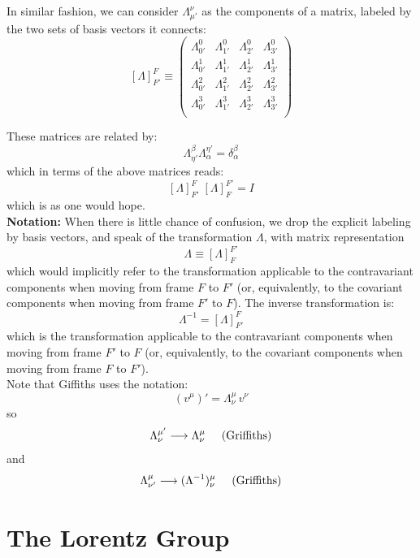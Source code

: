 \documentclass[12pt]{article}
\begin{document}
\noindent
In similar fashion, we can consider $\Lambda^{\nu}_{\mu'}$ as the
components of a matrix, labeled by the two sets of basis vectors it
connects:
$$[\Lambda]^F_{F'}
\equiv \begin{pmatrix}
  \Lambda^{0}_{0'} &\Lambda^{0}_{1'} &\Lambda^{0}_{2'} &\Lambda^{0}_{3'} \\[3pt]
  \Lambda^{1}_{0'} &\Lambda^{1}_{1'} &\Lambda^{1}_{2'} &\Lambda^{1}_{3'} \\[3pt]
  \Lambda^{2}_{0'} &\Lambda^{2}_{1'} &\Lambda^{2}_{2'} &\Lambda^{2}_{3'} \\[3pt]
  \Lambda^{3}_{0'} &\Lambda^{3}_{1'} &\Lambda^{3}_{2'} &\Lambda^{3}_{3'} \\
\end{pmatrix}$$

\noindent
These matrices are related by:
$$\Lambda^{\beta}_{\eta'} \Lambda^{\eta'}_{\alpha} = \delta^{\beta}_{\alpha}$$
which in terms of the above matrices reads:
$$[\Lambda]^F_{F'} \;  [\Lambda]^{F'}_F = I $$
which is as one would hope.\\[4pt]

\noindent
{\bf Notation:} When there is little chance of confusion,
we drop the explicit labeling by basis vectors, and speak
of the transformation $\Lambda$, with matrix representation
$$\Lambda \equiv [\Lambda]^{F'}_F$$
which would implicitly refer to the
transformation applicable to the contravariant components when moving
from frame $F$ to $F'$ (or, equivalently, to the covariant components
when moving from frame $F'$ to $F$).  The inverse transformation is:
$$\Lambda^{-1} = [\Lambda]^F_{F'}$$
which is the transformation applicable to the
contravariant components when moving from frame $F'$ to $F$ (or,
equivalently, to the covariant components when moving from frame $F$
to $F'$).\\[3pt]

\noindent
Note that Giffiths uses the notation:
$$(v^\mu)' = \Lambda^\mu_\nu \, v^\nu$$
so
$$\Lambda^{\mu'}_\nu \longrightarrow  \Lambda^\mu_\nu \hspace{0.5cm}(\text{Griffiths})$$
and
$$\Lambda^{\mu}_{\nu'} \longrightarrow  ({\Lambda^{-1}})^\mu_\nu \hspace{0.5cm}(\text{Griffiths})$$

\section{The Lorentz Group}
\end{document}
